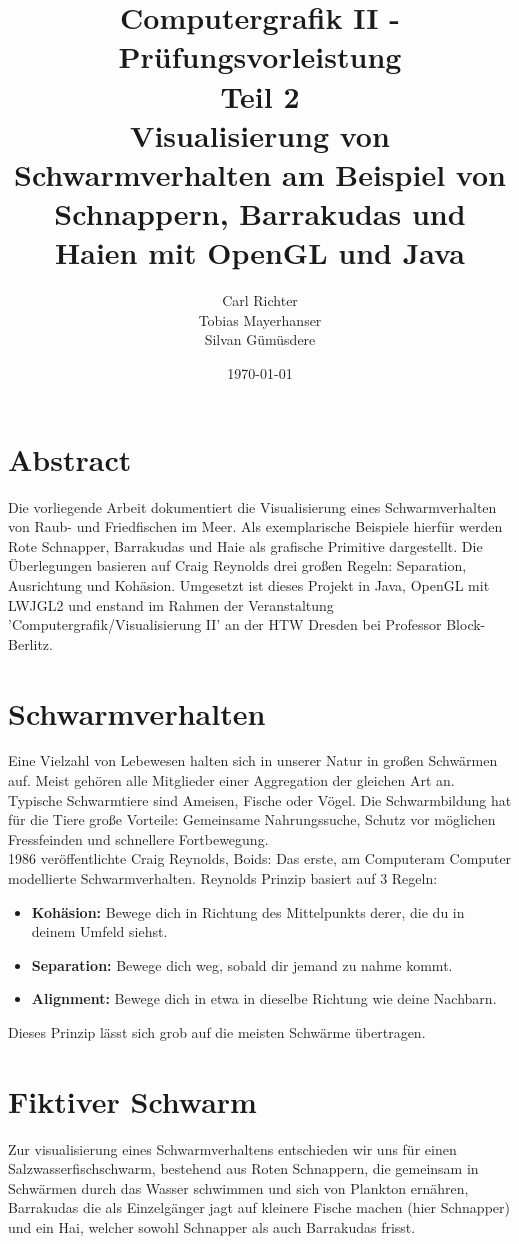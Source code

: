\documentclass[11pt]{article}
\title{\textbf{Computergrafik II - Prüfungsvorleistung}\\Teil 2\\Visualisierung von Schwarmverhalten am Beispiel von Schnappern, Barrakudas und Haien mit OpenGL und Java}
\date{\today}
\author{Carl Richter\\
		Tobias Mayerhanser\\
		Silvan Gümüsdere}
\begin{document}
\maketitle
\newpage
\tableofcontents
\newpage
\section{Abstract}
Die vorliegende Arbeit dokumentiert die Visualisierung eines Schwarmverhalten von Raub- und Friedfischen im Meer. Als exemplarische Beispiele hierfür werden Rote Schnapper, Barrakudas und Haie als grafische Primitive dargestellt. Die Überlegungen basieren auf Craig Reynolds drei großen Regeln: Separation, Ausrichtung und Kohäsion. Umgesetzt ist dieses Projekt in Java, OpenGL mit LWJGL2 und enstand im Rahmen der Veranstaltung 'Computergrafik/Visualisierung II' an der HTW Dresden bei Professor Block-Berlitz.
\section{Schwarmverhalten}
Eine Vielzahl von Lebewesen halten sich in unserer Natur in großen Schwärmen auf. Meist gehören alle Mitglieder einer Aggregation der gleichen Art an. Typische Schwarmtiere sind Ameisen, Fische oder Vögel. Die Schwarmbildung hat für die Tiere große Vorteile: Gemeinsame Nahrungssuche, Schutz vor möglichen Fressfeinden und schnellere Fortbewegung.\\
1986 veröffentlichte Craig Reynolds, Boids: Das erste, am Computeram Computer modellierte Schwarmverhalten. Reynolds Prinzip basiert auf 3 Regeln:
\begin{itemize}
	\item \textbf{Kohäsion:} Bewege dich in Richtung des Mittelpunkts derer, die du in deinem Umfeld siehst.
	\item \textbf{Separation:} Bewege dich weg, sobald dir jemand zu nahme kommt.
	\item \textbf{Alignment:} Bewege dich in etwa in dieselbe Richtung wie deine Nachbarn.
\end{itemize}
Dieses Prinzip lässt sich grob auf die meisten Schwärme übertragen.
\section{Fiktiver Schwarm}
Zur visualisierung eines Schwarmverhaltens entschieden wir uns für einen Salzwasserfischschwarm, bestehend aus Roten Schnappern, die gemeinsam in Schwärmen durch das Wasser schwimmen und sich von Plankton ernähren, Barrakudas die als Einzelgänger jagt auf kleinere Fische machen (hier Schnapper) und ein Hai, welcher sowohl Schnapper als auch Barrakudas frisst.
\end{document}
